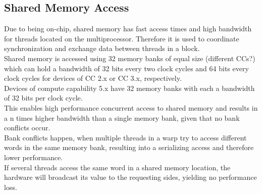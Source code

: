 \subsection{Shared Memory Access}
\label{shared_access}
Due to being on-chip, shared memory has fast access times and high bandwidth for threads located on the multiprocessor. Therefore it is used to coordinate synchronization and exchange data between threads in a block.\\
Shared memory is accessed using 32 memory banks of equal size (different CCs?) which can hold a bandwidth of 32 bits every two clock cycles and 64 bits every clock cycles for devices of CC 2.x or CC 3.x, respectively.\\
Devices of compute capability 5.x have 32 memory banks with each a bandwidth of 32 bits per clock cycle.\\
This enables high performance concurrent access to shared memory and results in a n times higher bandwidth than a single memory bank, given that no bank conflicts occur.\\
Bank conflicts happen, when multiple threads in a warp try to access different words in the same memory bank, resulting into a serializing access and therefore lower performance.\\
If several threads access the same word in a shared memory location, the hardware will broadcast its value to the requesting sides, yielding no performance loss.\\

